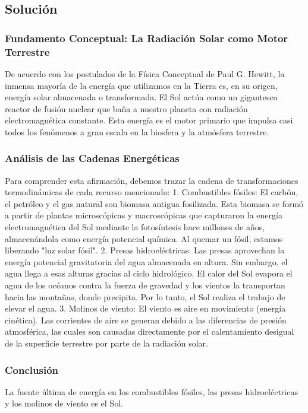 \documentclass[12pt,a4paper]{article}
\begin{document}
\subsection*{Solución}

\subsubsection*{Fundamento Conceptual: La Radiación Solar como Motor Terrestre}
De acuerdo con los postulados de la Física Conceptual de Paul G. Hewitt, la inmensa mayoría de la energía que utilizamos en la Tierra es, en su origen, energía solar almacenada o transformada. El Sol actúa como un gigantesco reactor de fusión nuclear que baña a nuestro planeta con radiación electromagnética constante. Esta energía es el motor primario que impulsa casi todos los fenómenos a gran escala en la biosfera y la atmósfera terrestre.

\subsubsection*{Análisis de las Cadenas Energéticas}
Para comprender esta afirmación, debemos trazar la cadena de transformaciones termodinámicas de cada recurso mencionado:
1. Combustibles fósiles: El carbón, el petróleo y el gas natural son biomasa antigua fosilizada. Esta biomasa se formó a partir de plantas microscópicas y macroscópicas que capturaron la energía electromagnética del Sol mediante la fotosíntesis hace millones de años, almacenándola como energía potencial química. Al quemar un fósil, estamos liberando "luz solar fósil".
2. Presas hidroeléctricas: Las presas aprovechan la energía potencial gravitatoria del agua almacenada en altura. Sin embargo, el agua llega a esas alturas gracias al ciclo hidrológico. El calor del Sol evapora el agua de los océanos contra la fuerza de gravedad y los vientos la transportan hacia las montañas, donde precipita. Por lo tanto, el Sol realiza el trabajo de elevar el agua.
3. Molinos de viento: El viento es aire en movimiento (energía cinética). Las corrientes de aire se generan debido a las diferencias de presión atmosférica, las cuales son causadas directamente por el calentamiento desigual de la superficie terrestre por parte de la radiación solar.

\subsubsection*{Conclusión}
La fuente última de energía en los combustibles fósiles, las presas hidroeléctricas y los molinos de viento es el Sol.
\end{document}
